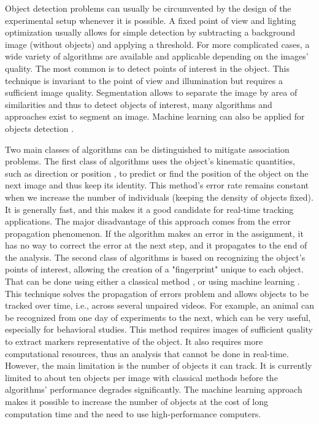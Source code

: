     Object detection problems can usually be circumvented by the design of the experimental setup whenever it is possible. A fixed point of view and lighting optimization usually allows for simple detection by subtracting a background image (without objects) and applying a threshold. For more complicated cases, a wide variety of algorithms are available \cite{yilmaz2006object} and applicable depending on the images' quality. The most common is to detect points of interest in the object. This technique is invariant to the point of view and illumination but requires a sufficient image quality. Segmentation allows to separate the image by area of similarities and thus to detect objects of interest, many algorithms and approaches exist to segment an image. Machine learning can also be applied for objects detection \cite{zhao2019object}.

    Two main classes of algorithms can be distinguished to mitigate association problems. The first class of algorithms uses the object's kinematic quantities, such as direction or position \cite{qian2016effective}, to predict or find the position of the object on the next image and thus keep its identity. This method's error rate remains constant when we increase the number of individuals (keeping the density of objects fixed). It is generally fast, and this makes it a good candidate for real-time tracking applications. The major disadvantage of this approach comes from the error propagation phenomenon. If the algorithm makes an error in the assignment, it has no way to correct the error at the next step, and it propagates to the end of the analysis.
    The second class of algorithms is based on recognizing the object's points of interest, allowing the creation of a "fingerprint" unique to each object. That can be done using either a classical method \cite{perez2014idtracker, bai2018automatic}, or using machine learning \cite{mathis2018deeplabcut, romero2019idtracker}. This technique solves the propagation of errors problem and allows objects to be tracked over time, i.e., across several unpaired videos. For example, an animal can be recognized from one day of experiments to the next, which can be very useful, especially for behavioral studies. This method requires images of sufficient quality to extract markers representative of the object. It also requires more computational resources, thus an analysis that cannot be done in real-time. However, the main limitation is the number of objects it can track. It is currently limited to about ten objects per image with classical methods before the algorithms' performance degrades significantly. The machine learning approach makes it possible to increase the number of objects at the cost of long computation time and the need to use high-performance computers.

